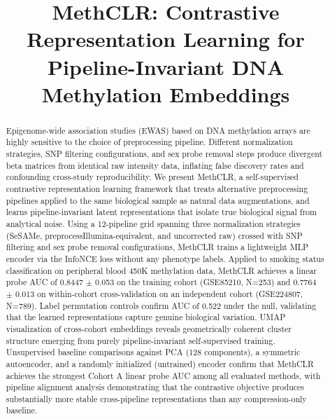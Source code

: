 \documentclass[conference]{IEEEtran}
\begin{document}
\title{MethCLR: Contrastive Representation Learning for\\Pipeline-Invariant DNA Methylation Embeddings}

\author{
}

\maketitle

\begin{abstract}
Epigenome-wide association studies (EWAS) based on DNA methylation arrays are highly sensitive to the choice of preprocessing pipeline. Different normalization strategies, SNP filtering configurations, and sex probe removal steps produce divergent beta matrices from identical raw intensity data, inflating false discovery rates and confounding cross-study reproducibility. We present MethCLR, a self-supervised contrastive representation learning framework that treats alternative preprocessing pipelines applied to the same biological sample as natural data augmentations, and learns pipeline-invariant latent representations that isolate true biological signal from analytical noise. Using a 12-pipeline grid spanning three normalization strategies (SeSAMe, preprocessIllumina-equivalent, and uncorrected raw) crossed with SNP filtering and sex probe removal configurations, MethCLR trains a lightweight MLP encoder via the InfoNCE loss without any phenotype labels. Applied to smoking status classification on peripheral blood 450K methylation data, MethCLR achieves a linear probe AUC of 0.8447 $\pm$ 0.053 on the training cohort (GSE85210, N=253) and 0.7764 $\pm$ 0.013 on within-cohort cross-validation on an independent cohort (GSE224807, N=789). Label permutation controls confirm AUC of 0.522 under the null, validating that the learned representations capture genuine biological variation. UMAP visualization of cross-cohort embeddings reveals geometrically coherent cluster structure emerging from purely pipeline-invariant self-supervised training. Unsupervised baseline comparisons against PCA (128 components), a symmetric autoencoder, and a randomly initialized (untrained) encoder confirm that MethCLR achieves the strongest Cohort A linear probe AUC among all evaluated methods, with pipeline alignment analysis demonstrating that the contrastive objective produces substantially more stable cross-pipeline representations than any compression-only baseline.
\end{abstract}
\end{document}
